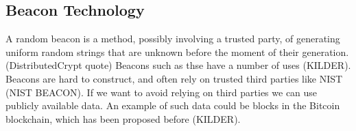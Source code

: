 \subsection{Beacon Technology}
A random beacon is a method, possibly involving a trusted party, of generating uniform random strings that are unknown before the moment of their generation. (DistributedCrypt quote) Beacons such as thse have a number of uses (KILDER). Beacons are hard to construct, and often rely on trusted third parties like NIST (NIST BEACON). If we want to avoid relying on third parties we can use publicly available data. An example of such data could be blocks in the Bitcoin blockchain, which has been proposed before (KILDER). 